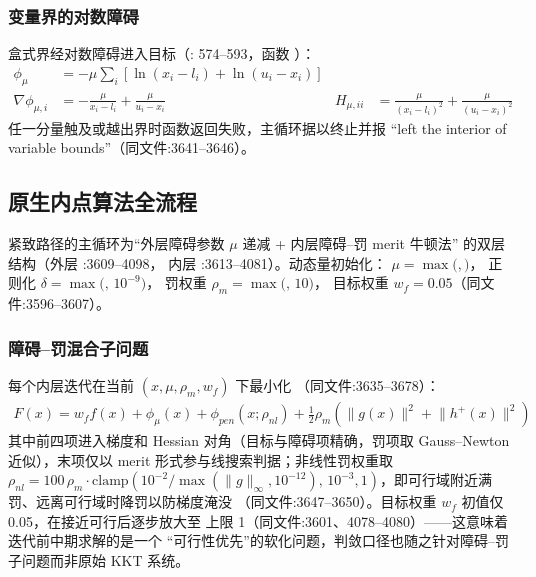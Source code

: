 \subsubsection*{变量界的对数障碍}
盒式界经对数障碍进入目标（:
574--593，函数 ）：
\begin{align*}
\phi_{\mu} &= -\mu\sum_{i}\left[\ln(x_i-l_i)+\ln(u_i-x_i)\right]\\
\nabla\phi_{\mu,i} &= -\frac{\mu}{x_i-l_i}+\frac{\mu}{u_i-x_i} &
H_{\mu,ii} &= \frac{\mu}{(x_i-l_i)^{2}}+\frac{\mu}{(u_i-x_i)^{2}}
\end{align*}
任一分量触及或越出界时函数返回失败，主循环据以终止并报
``left the interior of variable bounds''（同文件:3641--3646）。

\subsection{原生内点算法全流程}\label{subsec:acopfnative:algorithm}

紧致路径的主循环为``外层障碍参数 $\mu$ 递减 + 内层障碍--罚 merit 牛顿法''
的双层结构（外层 :3609--4098，
内层 :3613--4081）。动态量初始化：
$\mu=\max($$,$$)$，
正则化 $\delta=\max($$,\,10^{-9})$，
罚权重 $\rho_{m}=\max($$,\,10)$，
目标权重 $w_f=0.05$（同文件:3596--3607）。

\subsubsection*{障碍--罚混合子问题}
每个内层迭代在当前 $(x,\mu,\rho_m,w_f)$ 下最小化
（同文件:3635--3678）：
\begin{align*}
F(x) = w_f f(x) + \phi_{\mu}(x) + \phi_{pen}(x;\rho_{nl})
       + \tfrac{1}{2}\rho_m\left(\lVert g(x)\rVert^{2}+\lVert h^{+}(x)\rVert^{2}\right)
\end{align*}
其中前四项进入梯度和 Hessian 对角（目标与障碍项精确，罚项取
Gauss--Newton 近似），末项仅以 merit 形式参与线搜索判据；非线性罚权重取
$\rho_{nl}=100\,\rho_m\cdot\mathrm{clamp}(10^{-2}/\max(\lVert g\rVert_{\infty},
10^{-12}),\,10^{-3},1)$，即可行域附近满罚、远离可行域时降罚以防梯度淹没
（同文件:3647--3650）。目标权重 $w_f$ 初值仅 0.05，在接近可行后逐步放大至
上限 1（同文件:3601、4078--4080）——这意味着迭代前中期求解的是一个
``可行性优先''的软化问题，判敛口径也随之针对障碍--罚子问题而非原始 KKT 系统。

